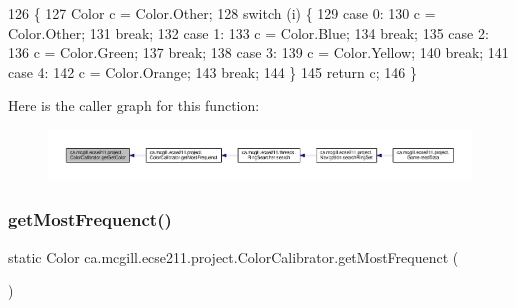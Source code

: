 \begin{DoxyCode}
126                                          \{
127     Color c = Color.Other;
128     \textcolor{keywordflow}{switch} (i) \{
129       \textcolor{keywordflow}{case} 0:
130         c = Color.Other;
131         \textcolor{keywordflow}{break};
132       \textcolor{keywordflow}{case} 1: 
133         c = Color.Blue;
134         \textcolor{keywordflow}{break};
135       \textcolor{keywordflow}{case} 2:
136         c = Color.Green;
137         \textcolor{keywordflow}{break};
138       \textcolor{keywordflow}{case} 3:
139         c = Color.Yellow;
140         \textcolor{keywordflow}{break};
141       \textcolor{keywordflow}{case} 4:
142         c = Color.Orange;
143         \textcolor{keywordflow}{break};
144     \}
145     \textcolor{keywordflow}{return} c;
146   \}
\end{DoxyCode}
Here is the caller graph for this function\+:
\nopagebreak
\begin{figure}[H]
\begin{center}
\leavevmode
\includegraphics[width=350pt]{classca_1_1mcgill_1_1ecse211_1_1project_1_1_color_calibrator_acb1d9cef0739971dbe00cc16712be0fe_icgraph}
\end{center}
\end{figure}
\mbox{\label{classca_1_1mcgill_1_1ecse211_1_1project_1_1_color_calibrator_a3d65927aaa2041f933dbdc19c3d2a412}} 
\subsubsection{\texorpdfstring{get\+Most\+Frequenct()}{getMostFrequenct()}}
{\footnotesize\ttfamily static Color ca.\+mcgill.\+ecse211.\+project.\+Color\+Calibrator.\+get\+Most\+Frequenct (\begin{DoxyParamCaption}{ }\end{DoxyParamCaption})\hspace{0.3cm}{\ttfamily [static]}}

